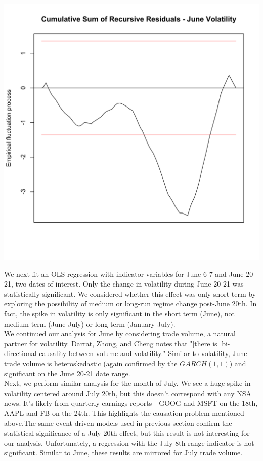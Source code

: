\documentclass[11pt]{amsart}
\begin{document}
\centerline{\includegraphics[scale=0.45]{june_cusum.pdf}}

We next fit an OLS regression with indicator variables for June 6-7 and June 20-21, two dates of interest. Only the change in volatility during June 20-21 was statistically significant. We considered whether this effect was only short-term by exploring the possibility of medium or long-run regime change post-June 20th. In fact, the spike in volatility is only significant in the short term (June), not medium term (June-July) or long term (January-July). \\

We continued our analysis for June by considering trade volume, a natural partner for volatility. Darrat, Zhong, and Cheng notes that "[there is] bi-directional causality between volume and volatility."  Similar to volatility, June trade volume is heteroskedastic (again confirmed by the $GARCH(1,1)$) and significant on the June 20-21 date range. \\

Next, we perform similar analysis for the month of July. We see a huge spike in volatility centered  around July 20th, but this doesn't correspond with any NSA news. It's likely from quarterly earnings reports - GOOG and MSFT on the 18th, AAPL and FB on the 24th. This highlights the causation problem mentioned above.The same event-driven models used in previous section confirm the statistical significance of a July 20th effect, but this result is not interesting for our analysis. Unfortunately, a regression with the July 8th range indicator is not significant. Similar to June, these results are mirrored for July trade volume. \\
\end{document}
